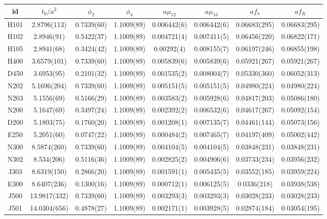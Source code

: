 \begin{sidewaystable}
\begin{center}
    \begin{tabular}{c c c c c c c c}
id & $t_0/a^2$ & $\phi_2$ & $\phi_4$ & $a\mu_{12}$ & $a\mu_{13}$ & $af_{\pi}$ & $af_K$ \\
\toprule
H101 & 2.8796(113) & 0.7339(60) & 1.1009(89) & 0.006442(6) & 0.006442(6) & 0.06683(295) & 0.06683(295) \\
H102 & 2.8946(91) & 0.5422(37) & 1.1009(89) & 0.004721(4) & 0.007411(5) & 0.06456(220) & 0.06822(171) \\
H105 & 2.8941(68) & 0.3424(42) & 1.1009(89) & 0.00292(4) & 0.008155(7) & 0.06197(246) & 0.06855(198) \\
\midrule
H400 & 3.6579(101) & 0.7339(60) & 1.1009(89) & 0.005839(6) & 0.005839(6) & 0.05921(267) & 0.05921(267) \\
D450 & 3.6953(95) & 0.2101(32) & 1.1009(89) & 0.001535(2) & 0.008004(7) & 0.05330(360) & 0.06052(313) \\
\midrule
N202 & 5.1696(204) & 0.7339(60) & 1.1009(89) & 0.005151(5) & 0.005151(5) & 0.04980(224) & 0.04980(224) \\
N203 & 5.1556(69) & 0.5166(29) & 1.1009(89) & 0.003583(2) & 0.005928(6) & 0.04817(203) & 0.05086(180) \\
N200 & 5.1647(69) & 0.3497(24) & 1.1009(89) & 0.002392(2) & 0.006532(6) & 0.04617(267) & 0.05092(154) \\
D200 & 5.1803(75) & 0.1760(20) & 1.1009(89) & 0.001208(1) & 0.007135(7) & 0.04461(144) & 0.05073(156) \\
E250 & 5.2051(60) & 0.0747(22) & 1.1009(89) & 0.000484(2) & 0.007465(7) & 0.04197(409) & 0.05002(442) \\
\midrule
N300 & 8.5874(260) & 0.7339(60) & 1.1009(89) & 0.004104(5) & 0.004104(5) & 0.03848(231) & 0.03848(231) \\
N302 & 8.534(206) & 0.5116(36) & 1.1009(89) & 0.002825(2) & 0.004906(6) & 0.03733(234) & 0.03956(232) \\
J303 & 8.6319(150) & 0.2866(20) & 1.1009(89) & 0.001591(1) & 0.005435(5) & 0.03552(185) & 0.03959(224) \\
E300 & 8.6407(236) & 0.1300(16) & 1.1009(89) & 0.000712(1) & 0.006125(5) & 0.0336(218) & 0.03938(538) \\
\midrule
J500 & 13.9817(332) & 0.7339(60) & 1.1009(89) & 0.003293(3) & 0.003293(3) & 0.03028(233) & 0.03028(233) \\
J501 & 14.0304(656) & 0.4878(27) & 1.1009(89) & 0.002171(1) & 0.003928(5) & 0.02874(184) & 0.03054(195) \\

\end{tabular}
\end{center}
\end{sidewaystable}
